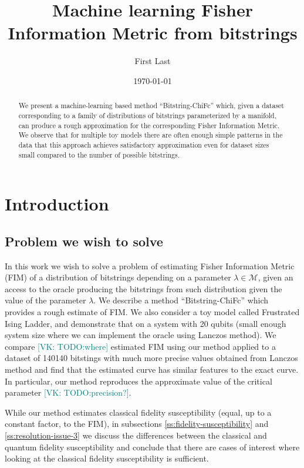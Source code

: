 \documentclass[american,aps,pra,reprint,floatfix,nofootinbib,superscriptaddress]{revtex4-2}
\newcommand{\VK}[1]{\textcolor{teal}{[VK: #1]}}
\begin{document}
\title{Machine learning Fisher Information Metric from bitstrings}
\author{First Last}

\date{\today}

\begin{abstract}
We present a machine-learning based method ``Bitstring-ChiFc'' which,
given a dataset corresponding to a family of distributions of bitstrings
parameterized by a manifold, can produce a rough approximation
for the corresponding Fisher Information Metric.
We observe that for multiple toy models there are often enough simple patterns
in the data that this approach
achieves satisfactory approximation even for dataset sizes small
compared to the number of possible bitstrings.
\end{abstract}

\maketitle

\section{Introduction}
\subsection{Problem we wish to solve}
In this work we wish to solve a problem of estimating Fisher Information Metric
(FIM) of a distribution of bitstrings depending on a parameter
$\lambda \in \mathcal{M}$, given an access to the oracle producing the
bitstrings from such distribution given the value of the parameter $\lambda$.
We describe a method ``Bitstring-ChiFc'' which provides a rough estimate of FIM.
We also consider a toy model called Frustrated Ising Ladder, and demonstrate
that on a system with 20 qubits (small enough system size where we can
implement the oracle using Lanczos method).
We compare \VK{TODO:where} estimated FIM using our method applied to a dataset
of 140140 bitstings with much more precise values obtained from
Lanczos method and find that the estimated curve has similar features
to the exact curve. In particular, our method reproduces the approximate value
of the critical parameter \VK{TODO:precision?}.

While our method estimates classical fidelity susceptibility (equal, up to
a constant factor, to the FIM), in subsections
\ref{ss:fidelity-susceptibility} and \ref{ss:resolution-issue-3}
we discuss the differences between the classical and quantum fidelity
susceptibility and conclude that there are cases of interest
where looking at the classical fidelity susceptibility is sufficient.
\end{document}
